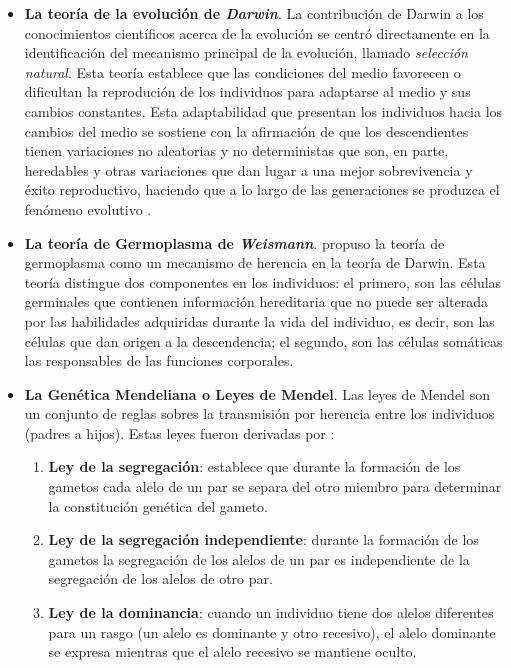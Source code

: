   \begin{itemize}
   \item \textbf{La teor\'ia de la evoluci\'on de \textit{Darwin}}. La contribuci\'on de Darwin a los conocimientos 
   cient\'ificos acerca de la evoluci\'on se centr\'o directamente en la identificaci\'on del mecanismo principal de la 
   evoluci\'on, llamado \textit{selecci\'on} \textit{natural}. Esta teor\'ia establece que las condiciones del medio 
   favorecen o dificultan la reproduci\'on de los individuos para adaptarse al medio y sus cambios constantes. Esta 
   adaptabilidad que presentan los individuos hacia los cambios del medio se sostiene con la afirmaci\'on 
   de que los descendientes tienen variaciones no aleatorias y no deterministas que son, en parte, heredables y otras
   variaciones que dan lugar a una mejor sobrevivencia y \'exito reproductivo, haciendo que a lo largo de las generaciones 
   se produzca el fen\'omeno evolutivo \cite{darwin59}.
 
   \item \textbf{La teor\'ia de Germoplasma de \textit{Weismann}}. \cite{Weismann93} propuso la teor\'ia de germoplasma 
   como un mecanismo de herencia en la teor\'ia de Darwin. Esta teor\'ia distingue dos componentes en los individuos: 
   el primero, son las c\'elulas germinales que contienen informaci\'on hereditaria que no puede ser alterada por las 
   habilidades adquiridas durante la vida del individuo, es decir, son las c\'elulas que dan origen a la descendencia; 
   el segundo, son las c\'elulas som\'aticas las responsables de las funciones corporales.
   
   \item \textbf{La Gen\'etica Mendeliana o Leyes de Mendel}. Las leyes de Mendel son un conjunto de reglas sobres la 
   transmisi\'on por herencia entre los individuos (padres a hijos). Estas leyes fueron derivadas por \cite{Mendel01}:
   
   \begin{enumerate}
    \item \textbf{Ley de la segregaci\'on}: establece que durante la formaci\'on de los gametos cada alelo de un par se 
    separa del otro miembro para determinar la constituci\'on gen\'etica del gameto.
    \item \textbf{Ley de la segregaci\'on independiente}: durante la formaci\'on de los gametos la segregaci\'on de los 
    alelos de un par es independiente de la segregaci\'on de los alelos de otro par.
    \item \textbf{Ley de la dominancia}: cuando un individuo tiene dos alelos diferentes para un rasgo (un alelo es 
    dominante y otro recesivo), el alelo dominante se expresa mientras que el alelo recesivo se mantiene oculto.
   \end{enumerate}


\end{itemize}
